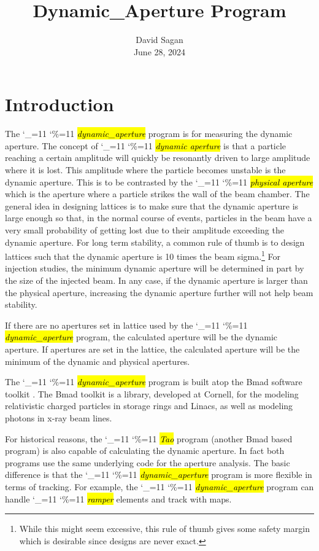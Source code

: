 \documentclass{hitec}
\title{Dynamic_Aperture Program}
\author{}
\date{David Sagan \\ June 28, 2024}
\newcommand\dottcmd[1]{\hl{\em#1}\endgroup}
\newcommand{\vn}{\begingroup\catcode`\_=11 \catcode`\%=11 \dottcmd}
\newcommand{\da}{\vn{dynamic_aperture}\xspace}
\newcommand{\Section}[1]{\section{#1}\vspace*{-1ex}}
\begin{document}

\maketitle

\tableofcontents

\Section{Introduction} 
\label{s:intro}

The \da program is for measuring the dynamic aperture. The concept of \vn{dynamic aperture} is that
a particle reaching a certain amplitude will quickly be resonantly driven to large amplitude where
it is lost. This amplitude where the particle becomes unstable is the dynamic aperture. This is to
be contrasted by the \vn{physical aperture} which is the aperture where a particle strikes the wall
of the beam chamber. The general idea in designing lattices is to make sure that the dynamic
aperture is large enough so that, in the normal course of events, particles in the beam have a very
small probability of getting lost due to their amplitude exceeding the dynamic aperture. For long
term stability, a common rule of thumb is to design lattices such that the dynamic aperture is 10 times
the beam sigma.\footnote
  {
While this might seem excessive, this rule of thumb gives some safety margin which is desirable
since designs are never exact.
  }
For injection studies, the minimum dynamic aperture will be determined in part by the size of the
injected beam. In any case, if the dynamic aperture is larger than the physical aperture, increasing
the dynamic aperture further will not help beam stability. 

If there are no apertures set in lattice used by the \da program, the calculated aperture will be the
dynamic aperture. If apertures are set in the lattice, the calculated aperture will be the minimum of
the dynamic and physical apertures.

The \da program is built atop the Bmad software toolkit \cite{b:bmad}. The Bmad toolkit is a
library, developed at Cornell, for the modeling relativistic charged particles in storage rings and
Linacs, as well as modeling photons in x-ray beam lines.

For historical reasons, the \vn{Tao} program (another Bmad based program) is also capable of
calculating the dynamic aperture.  In fact both programs use the same underlying code for the
aperture analysis. The basic difference is that the \da program is more flexible in terms of
tracking. For example, the \da program can handle \vn{ramper} elements and track with maps.
\end{document}
